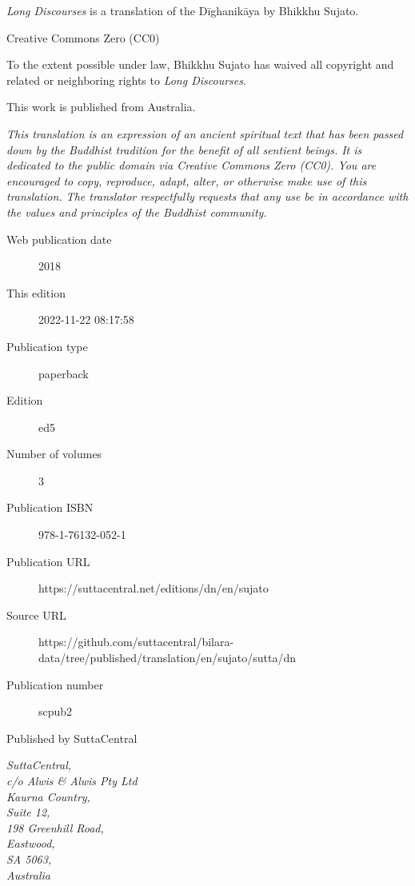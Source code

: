\documentclass[12pt,openany]{book}%
\begin{document}
\begin{footnotesize}

\textit{Long Discourses} is a translation of the Dīghanikāya by Bhikkhu Sujato.

\medskip

Creative Commons Zero (CC0)

To the extent possible under law, Bhikkhu Sujato has waived all copyright and related or neighboring rights to \textit{Long Discourses}.

\medskip

This work is published from Australia.

\begin{center}
\textit{This translation is an expression of an ancient spiritual text that has been passed down by the Buddhist tradition for the benefit of all sentient beings. It is dedicated to the public domain via Creative Commons Zero (CC0). You are encouraged to copy, reproduce, adapt, alter, or otherwise make use of this translation. The translator respectfully requests that any use be in accordance with the values and principles of the Buddhist community.}
\end{center}

\medskip

\begin{description}
    \item[Web publication date] 2018
    \item[This edition] 2022-11-22 08:17:58
    \item[Publication type] paperback
    \item[Edition] ed5
    \item[Number of volumes] 3
    \item[Publication ISBN] 978-1-76132-052-1
    \item[Publication URL] https://suttacentral.net/editions/dn/en/sujato
    \item[Source URL] https://github.com/suttacentral/bilara-data/tree/published/translation/en/sujato/sutta/dn
    \item[Publication number] scpub2
\end{description}

\medskip

Published by SuttaCentral

\medskip

\textit{SuttaCentral,\\
c/o Alwis \& Alwis Pty Ltd\\
Kaurna Country,\\
Suite 12,\\
198 Greenhill Road,\\
Eastwood,\\
SA 5063,\\
Australia}

\end{footnotesize}
\end{document}
